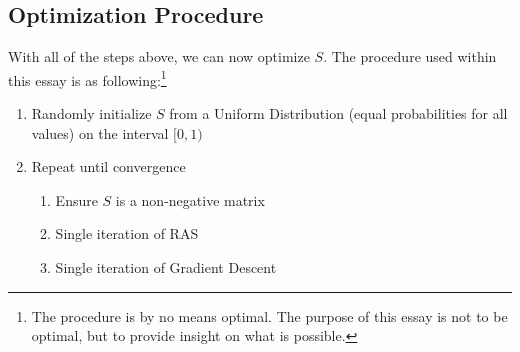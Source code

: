 \subsection{Optimization Procedure}%
\label{sub:optimization_procedure}
With all of the steps above, we can now optimize $S$. The procedure used within this essay is as following:\footnote{The procedure is by no means optimal. The purpose of this essay is not to be optimal, but to provide insight on what is possible.}
\begin{enumerate}
    \item Randomly initialize $S$ from a Uniform Distribution (equal probabilities for all values) on the interval $[0,1)$
    \item Repeat until convergence
    \begin{enumerate}
        \item Ensure $S$ is a non-negative matrix
         \item Single iteration of RAS
         \item Single iteration of Gradient Descent
    \end{enumerate}
\end{enumerate}
